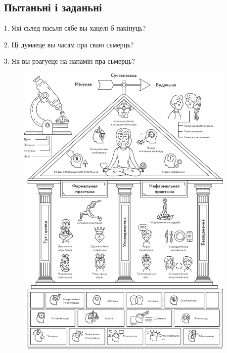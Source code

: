 \subsection*{Пытаньні і заданьні}

1. Які сьлед пасьля сябе вы хацелі б пакінуць?

2. Ці думаеце вы часам пра сваю сьмерць?

3. Як вы рэагуеце на напамін пра сьмерць?

\clearpage
\thispagestyle{empty}
\begin{figure}[htb!]
  \vspace*{-0.15in}
  \includegraphics[width=0.95\textwidth]{willpower/ch8/full.pdf}  
\end{figure}
